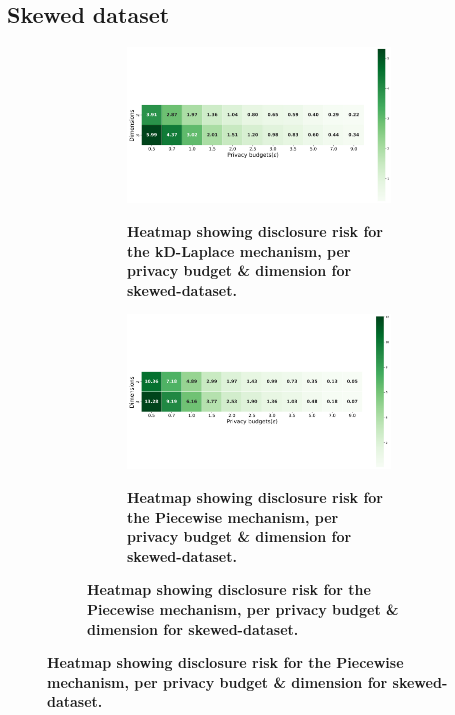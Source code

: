 \subsection{Skewed dataset} \label{appendix:results-privacy-skewed-dataset}
\begin{figure}
    \centering
    \begin{subfigure}[b]{0.85\textwidth}
        \begin{subfigure}[c]{1\textwidth}
            \caption{\textbf{Heatmap showing disclosure risk for the kD-Laplace mechanism, per privacy budget \& dimension for skewed-dataset.}}
            \includegraphics[width=1\textwidth]{Results/kd-laplace/kd-Laplace/skewed-dataset/distance.png}
            \label{fig:privacy-risk_skewed-dataset_adversial_advantage_kd-laplace}
        \end{subfigure}
        \vfill %

        \begin{subfigure}[c]{1\textwidth}
            \caption{\textbf{Heatmap showing disclosure risk for the Piecewise mechanism, per privacy budget \& dimension for skewed-dataset.}}
            \includegraphics[width=1\textwidth]{Results/kd-laplace/piecewise/skewed-dataset/distance.png}
            \label{fig:privacy-risk_skewed-dataset_adversial_advantage_piecewise}
        \end{subfigure}
    \end{subfigure}
 \end{figure}
\newpage

